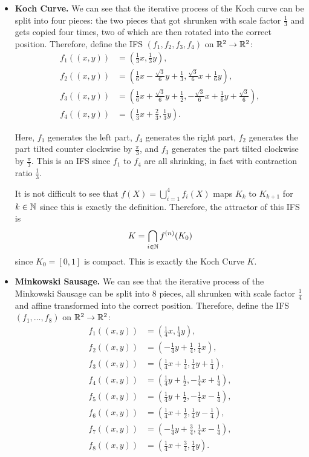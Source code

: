 \begin{itemize}
    \item \textbf{Koch Curve.} We can see that the iterative process of the Koch curve can be split into four pieces: the two pieces that got shrunken with scale factor \(\frac{1}{3}\) and gets copied four times, two of which are then rotated into the correct position. Therefore, define the IFS \((f_1, f_2, f_3, f_4)\) on \(\mathbb{R}^2 \to \mathbb{R}^2\):
    \begin{align*}
        f_1((x, y)) &= \left(\frac{1}{3}x, \frac{1}{3}y\right),\\
        f_2((x, y)) &= \left(\frac{1}{6}x - \frac{\sqrt{3}}{6}y + \frac{1}{3}, \frac{\sqrt{3}}{6}x + \frac{1}{6}y\right),\\
        f_3((x, y)) &= \left(\frac{1}{6}x + \frac{\sqrt{3}}{6}y + \frac{1}{2}, -\frac{\sqrt{3}}{6}x + \frac{1}{6}y + \frac{\sqrt{3}}{6}\right),\\
        f_4((x, y)) &= \left(\frac{1}{3}x + \frac{2}{3}, \frac{1}{3}y\right).
    \end{align*}

    Here, \(f_1\) generates the left part, \(f_4\) generates the right part, \(f_2\) generates the part tilted counter clockwise by \(\frac{\pi}{3}\), and \(f_3\) generates the part tilted clockwise by \(\frac{\pi}{3}\). This is an IFS since \(f_1\) to \(f_4\) are all shrinking, in fact with contraction ratio \(\frac{1}{3}\).

    It is not difficult to see that \(f(X) = \bigcup_{i = 1}^{4} f_i(X)\) maps \(K_k\) to \(K_{k + 1}\) for \(k \in \mathbb{N}\) since this is exactly the definition. Therefore, the attractor of this IFS is
    \[
        K = \bigcap_{i \in \mathbb{N}} f^{(n)}(K_0)
    \]
    since \(K_0 = [0, 1]\) is compact. This is exactly the Koch Curve \(K\).

    \item \textbf{Minkowski Sausage.} We can see that the iterative process of the Minkowski Sausage can be split into 8 pieces, all shrunken with scale factor \(\frac{1}{4}\) and affine transformed into the correct position. Therefore, define the IFS \((f_1, \ldots, f_8)\) on \(\mathbb{R}^2 \to \mathbb{R}^2\):
    \begin{align*}
        f_1((x, y)) &= \left(\frac{1}{4}x, \frac{1}{4}y\right),\\
        f_2((x, y)) &= \left(-\frac{1}{4}y + \frac{1}{4}, \frac{1}{4}x\right),\\
        f_3((x, y)) &= \left(\frac{1}{4}x + \frac{1}{4}, \frac{1}{4}y + \frac{1}{4}\right),\\
        f_4((x, y)) &= \left(\frac{1}{4}y + \frac{1}{2}, -\frac{1}{4}x + \frac{1}{4}\right),\\
        f_5((x, y)) &= \left(\frac{1}{4}y + \frac{1}{2}, -\frac{1}{4}x - \frac{1}{4}\right),\\
        f_6((x, y)) &= \left(\frac{1}{4}x + \frac{1}{2}, \frac{1}{4}y - \frac{1}{4}\right),\\
        f_7((x, y)) &= \left(-\frac{1}{4}y + \frac{3}{4}, \frac{1}{4}x - \frac{1}{4}\right),\\
        f_8((x, y)) &= \left(\frac{1}{4}x + \frac{3}{4}, \frac{1}{4}y\right).\\
    \end{align*}


\end{itemize}
